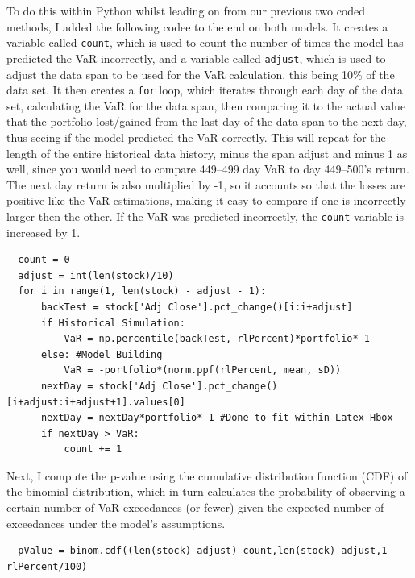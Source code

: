 \documentclass{article}
\begin{document}
To do this within Python whilst leading on from our previous two coded methods, I added the following codee to the end on both models. It creates a variable called \texttt{count}, which is used to count the number of times the model has predicted the VaR incorrectly, and a variable called \texttt{adjust}, which is used to adjust the data span to be used for the VaR calculation, this being 10\% of the data set. It then creates a \texttt{for} loop, which iterates through each day of the data set, calculating the VaR for the data span, then comparing it to the actual value that the portfolio lost/gained from the last day of the data span to the next day, thus seeing if the model predicted the VaR correctly. This will repeat for the length of the entire historical data history, minus the span adjust and minus 1 as well, since you would need to compare 449--499 day VaR to day 449--500's return. The next day return is also multiplied by -1, so it accounts so that the losses are positive like the VaR estimations, making it easy to compare if one is incorrectly larger then the other. If the VaR was predicted incorrectly, the \texttt{count} variable is increased by 1.\\\vspace{0.3cm}

\begin{verbatim}
  count = 0
  adjust = int(len(stock)/10)
  for i in range(1, len(stock) - adjust - 1):
      backTest = stock['Adj Close'].pct_change()[i:i+adjust]
      if Historical Simulation:
          VaR = np.percentile(backTest, rlPercent)*portfolio*-1
      else: #Model Building
          VaR = -portfolio*(norm.ppf(rlPercent, mean, sD))
      nextDay = stock['Adj Close'].pct_change()[i+adjust:i+adjust+1].values[0]
      nextDay = nextDay*portfolio*-1 #Done to fit within Latex Hbox
      if nextDay > VaR:
          count += 1
\end{verbatim}

 Next, I compute the p-value using the cumulative distribution function (CDF) of the binomial distribution, which in turn calculates the probability of observing a certain number of VaR exceedances (or fewer) given the expected number of exceedances under the model's assumptions.\vspace{0.3cm}
 
 \begin{verbatim}
  pValue = binom.cdf((len(stock)-adjust)-count,len(stock)-adjust,1-rlPercent/100)
  \end{verbatim}
\end{document}
